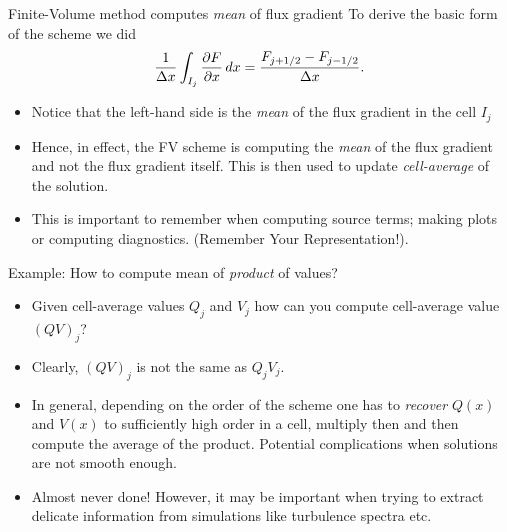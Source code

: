 \documentclass[aspectratio=169]{beamer}
\newcommand{\mypause}{}
\newcommand{\pfrac}[2]{\frac{\partial #1}{\partial #2}}
\begin{document}
\begin{frame}{Finite-Volume method computes \emph{mean} of flux gradient}
  To derive the basic form of the scheme we did
  \begin{align*}
    \frac{1}{\Delta x}\int_{I_j} \pfrac{F}{x} \thinspace dx =
    \frac{F_{j+1/2}-F_{j-1/2}}{\Delta x}.
  \end{align*}
  \begin{itemize}
  \item Notice that the left-hand side is the \emph{mean} of the flux
    gradient in the cell $I_j$
  \item Hence, in effect, the FV scheme is computing the \emph{mean}
    of the flux gradient and not the flux gradient itself. This is
    then used to update \emph{cell-average} of the solution.
  \item This is important to remember when computing source terms;
    making plots or computing diagnostics. (Remember Your
    Representation!).
  \end{itemize}
  
\end{frame}

\begin{frame}{Example: How to compute mean of \emph{product} of
    values?}
  \begin{itemize}
  \item Given cell-average values $Q_j$ and $V_j$ how can you compute
    cell-average value $(QV)_j$?%
    \mypause%
  \item Clearly, $(Q V)_j$ is not the same as $Q_j V_j$.%
    \mypause%
  \item In general, depending on the order of the scheme one has to
    \emph{recover} $Q(x)$ and $V(x)$ to sufficiently high order in a
    cell, multiply then and then compute the average of the
    product. Potential complications when solutions are not smooth
    enough.
  \item Almost never done! However, it may be important when trying to
    extract delicate information from simulations like turbulence
    spectra etc.
  \end{itemize}
\end{frame}
\end{document}
